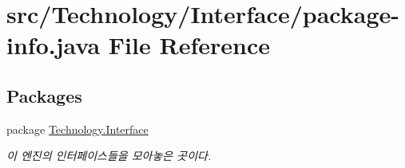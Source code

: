 \hypertarget{_technology_2_interface_2package-info_8java}{\section{src/\-Technology/\-Interface/package-\/info.java File Reference}
\label{_technology_2_interface_2package-info_8java}
}
\subsection*{Packages}
\begin{DoxyCompactItemize}
\item 
package \hyperlink{namespace_technology_1_1_interface}{Technology.\-Interface}
\begin{DoxyCompactList}\small\item\em 이 엔진의 인터페이스들을 모아놓은 곳이다. \end{DoxyCompactList}\end{DoxyCompactItemize}
